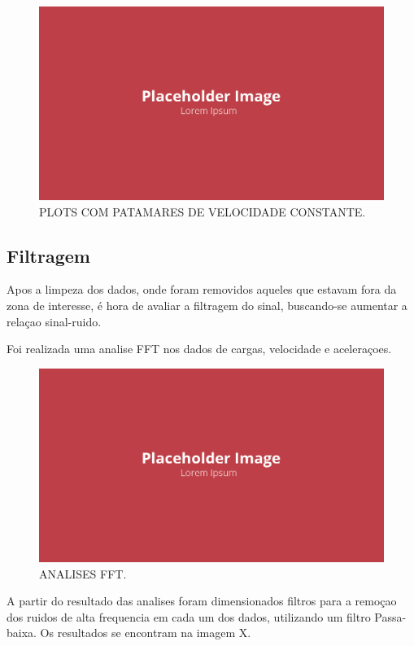 \begin{figure}[!ht]
    \centering
    \includegraphics[width=.8\linewidth]{figuras/placeholder.png}
    \caption{PLOTS COM PATAMARES DE VELOCIDADE CONSTANTE\cite{autor}.}
    \label{fig:placeholder}
\end{figure}

\subsection{Filtragem}

Apos a limpeza dos dados, onde foram removidos aqueles que estavam fora da zona de interesse, é hora de avaliar a filtragem do sinal, buscando-se aumentar a relaçao sinal-ruido.

Foi realizada uma analise FFT nos dados de cargas, velocidade e aceleraçoes.

\begin{figure}[!ht]
    \centering
    \includegraphics[width=.8\linewidth]{figuras/placeholder.png}
    \caption{ANALISES FFT\cite{autor}.}
    \label{fig:placeholder}
\end{figure}

A partir do resultado das analises foram dimensionados filtros para a remoçao dos ruidos de alta frequencia em cada um dos dados, utilizando um filtro Passa-baixa. Os resultados se encontram na imagem X.

